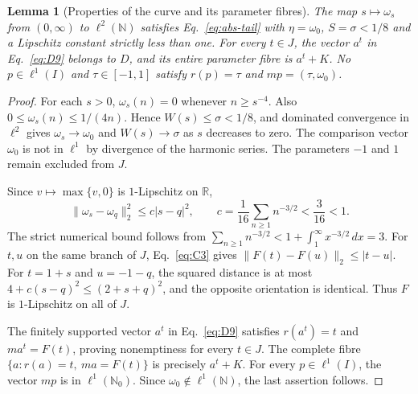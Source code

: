 \documentclass[11pt]{article}
\newcommand{\R}{\mathbb R}
\newcommand{\N}{\mathbb N}
\newcommand{\Nzero}{\mathbb N_0}
\newtheorem{lemma}{Lemma}
\theoremstyle{definition}
\theoremstyle{remark}
\begin{document}
\begin{lemma}[Properties of the curve and its parameter fibres]
\label{lem:coordinate-profile}
The map $s\mapsto\omega_s$ from $(0,\infty)$ to $\ell^2(\N)$
satisfies Eq.~\eqref{eq:abs-tail} with $\eta=\omega_0$, $S=\sigma<1/8$
and a Lipschitz constant strictly less than one. For every $t\in J$,
the vector $a^t$ in Eq.~\eqref{eq:D9} belongs to $D$, and its entire
parameter fibre is $a^t+K$. No $p\in\ell^1(I)$ and $\tau\in[-1,1]$
satisfy $r(p)=\tau$ and $mp=(\tau,\omega_0)$.
\end{lemma}
\begin{proof}
\label{sec:C2}
For each $s>0$, $\omega_s(n)=0$ whenever $n\ge s^{-4}$. Also
$0\le\omega_s(n)\le1/(4n)$. Hence $W(s)\le\sigma<1/8$, and dominated
convergence in $\ell^2$ gives $\omega_s\to\omega_0$ and $W(s)\to\sigma$
as $s$ decreases to zero. The comparison vector $\omega_0$ is not in
$\ell^1$ by divergence of the harmonic series. The parameters $-1$ and $1$
remain excluded from $J$.

Since $v\mapsto\max\{v,0\}$ is $1$-Lipschitz on $\R$,
\begin{equation}
\|\omega_s-\omega_q\|_2^2\le c|s-q|^2,\qquad
c=\frac1{16}\sum_{n\ge1}n^{-3/2}<\frac3{16}<1.
\label{eq:C3}
\end{equation}
The strict numerical bound follows from
$\sum_{n\ge1}n^{-3/2}<1+\int_1^\infty x^{-3/2}\,dx=3$.
For $t,u$ on the same branch of $J$, Eq.~\eqref{eq:C3} gives
$\|F(t)-F(u)\|_2\le|t-u|$. For $t=1+s$ and $u=-1-q$, the squared
distance is at most $4+c(s-q)^2\le(2+s+q)^2$, and the opposite
orientation is identical. Thus $F$ is $1$-Lipschitz on all of $J$.

The finitely supported vector $a^t$ in Eq.~\eqref{eq:D9} satisfies $r(a^t)=t$ and
$ma^t=F(t)$, proving nonemptiness for every $t\in J$. The complete
fibre $\{a:r(a)=t,\ ma=F(t)\}$ is precisely $a^t+K$.
For every $p\in\ell^1(I)$, the vector $mp$ is in $\ell^1(\Nzero)$.
Since $\omega_0\notin\ell^1(\N)$, the last assertion follows.
\end{proof}
\end{document}
